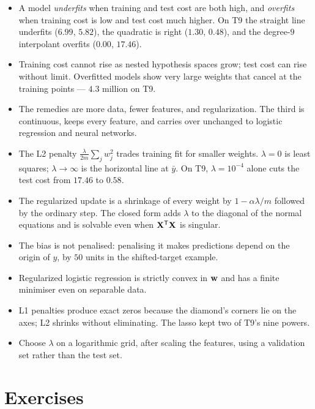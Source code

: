 \begin{itemize}
  \item A model \emph{underfits} when training and test cost are both high, and
        \emph{overfits} when training cost is low and test cost much higher. On
        T9 the straight line underfits ($6.99$, $5.82$), the quadratic is right
        ($1.30$, $0.48$), and the degree-$9$ interpolant overfits ($0.00$,
        $17.46$).
  \item Training cost cannot rise as nested hypothesis spaces grow; test cost can
        rise without limit. Overfitted models show very large weights that
        cancel at the training points --- $4.3$ million on T9.
  \item The remedies are more data, fewer features, and regularization. The
        third is continuous, keeps every feature, and carries over unchanged to
        logistic regression and neural networks.
  \item The L2 penalty $\frac{\lambda}{2m}\sum_j w_j^2$ trades training fit for
        smaller weights. $\lambda=0$ is least squares; $\lambda\to\infty$ is the
        horizontal line at $\bar y$. On T9, $\lambda = 10^{-4}$ alone cuts the
        test cost from $17.46$ to $0.58$.
  \item The regularized update is a shrinkage of every weight by
        $1-\alpha\lambda/m$ followed by the ordinary step. The closed form adds
        $\lambda$ to the diagonal of the normal equations and is solvable even
        when $\mathbf{X}^{\mathsf{T}}\mathbf{X}$ is singular.
  \item The bias is not penalised: penalising it makes predictions depend on the
        origin of $y$, by $50$ units in the shifted-target example.
  \item Regularized logistic regression is strictly convex in $\mathbf{w}$ and has a
        finite minimiser even on separable data.
  \item L1 penalties produce exact zeros because the diamond's corners lie on
        the axes; L2 shrinks without eliminating. The lasso kept two of T9's
        nine powers.
  \item Choose $\lambda$ on a logarithmic grid, after scaling the features, using
        a validation set rather than the test set.
\end{itemize}

\section*{Exercises}


